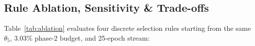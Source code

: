 \documentclass[10pt,twocolumn,letterpaper]{article}
\begin{document}
\subsection{Rule Ablation, Sensitivity \& Trade-offs}
\label{sec:ablation}
\begin{table}[t]
\centering\small\setlength{\tabcolsep}{2pt}

\caption{Controlled ablation of discrete selection rules from shared $\theta_5$ under equal phase-2 capacity ($b=3$, $110{,}595$ trainable parameters) and identical 25-epoch streams (3-seed mean$\pm$std). Restricted Gate selects $\{6,7,8\}$, $\{2,6,8\}$, $\{6,7,8\}$ on seeds 3407--3409.}
\label{tab:ablation}
\end{table}
Table~\ref{tab:ablation} evaluates four discrete selection rules starting from the same $\theta_5$, 3.03\% phase-2 budget, and 25-epoch stream:
\end{document}
